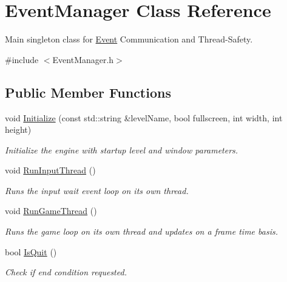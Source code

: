 \hypertarget{classEventManager}{}\section{Event\+Manager Class Reference}
\label{classEventManager}


Main singleton class for \hyperlink{classEvent}{Event} Communication and Thread-\/\+Safety.  




{\ttfamily \#include $<$Event\+Manager.\+h$>$}

\subsection*{Public Member Functions}
\begin{DoxyCompactItemize}
\item 
void \hyperlink{classEventManager_a022d6900791224503f73f6aaabc3f8d6}{Initialize} (const std\+::string \&level\+Name, bool fullscreen, int width, int height)
\begin{DoxyCompactList}\small\item\em Initialize the engine with startup level and window parameters. \end{DoxyCompactList}\item 
\mbox{\label{classEventManager_af60686b5d689043da47c3620cee4e262}} 
void \hyperlink{classEventManager_af60686b5d689043da47c3620cee4e262}{Run\+Input\+Thread} ()
\begin{DoxyCompactList}\small\item\em Runs the input wait event loop on its own thread. \end{DoxyCompactList}\item 
\mbox{\label{classEventManager_a6a2500c028c89fb05e12015e26b6cc21}} 
void \hyperlink{classEventManager_a6a2500c028c89fb05e12015e26b6cc21}{Run\+Game\+Thread} ()
\begin{DoxyCompactList}\small\item\em Runs the game loop on its own thread and updates on a frame time basis. \end{DoxyCompactList}\item 
bool \hyperlink{classEventManager_a59a5258ef9924dedb12f1b35df8cd5cd}{Is\+Quit} ()
\begin{DoxyCompactList}\small\item\em Check if end condition requested. \end{DoxyCompactList}\item 

\end{DoxyCompactItemize}
